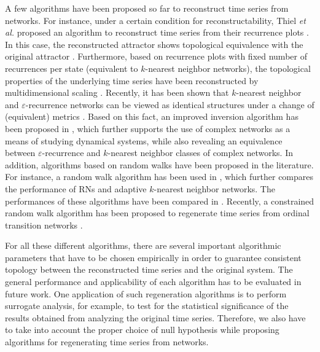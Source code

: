 A few algorithms have been proposed so far to reconstruct time series from networks. For instance, under a certain condition for reconstructability, Thiel {\textit{et al.}} proposed an algorithm to reconstruct time series from their recurrence plots \cite{thiel2004b,Robinson2009}. In this case, the reconstructed attractor shows topological equivalence with the original attractor \cite{Zhao2014}. Furthermore, based on recurrence plots with fixed
number of recurrences per state (equivalent to $k$-nearest neighbor networks), the topological properties of the underlying time series have been reconstructed by multidimensional scaling \cite{hirata2008}. Recently, it has been shown that $k$-nearest neighbor and $\varepsilon$-recurrence networks can be viewed as identical structures under a change of (equivalent) metrics \cite{Khor2016}. Based on this fact, an improved inversion algorithm has been proposed in \cite{Khor2016}, which further supports the use of complex networks as a means of studying dynamical systems, while also revealing an equivalence between $\varepsilon$-recurrence and $k$-nearest neighbor classes of complex networks. In addition, algorithms based on random walks have been proposed in the literature. For instance, a random walk algorithm has been used in \cite{Hou2015}, which further compares the performance of RNs and adaptive $k$-nearest neighbor networks. The performances of these algorithms have been compared in \cite{Liu2013c}. Recently, a constrained random walk algorithm has been proposed to regenerate time series from ordinal transition networks \cite{McCullough2017}.

For all these different algorithms, there are several important algorithmic parameters that have to be chosen empirically in order to guarantee consistent topology between the reconstructed time series and the original system. The general performance and applicability of each algorithm has to be evaluated in future work. One application of such regeneration algorithms is to perform surrogate analysis, for example, to test for the statistical significance of the results obtained from analyzing the original time series. Therefore, we also have to take into account the proper choice of null hypothesis while proposing algorithms for regenerating time series from networks.

